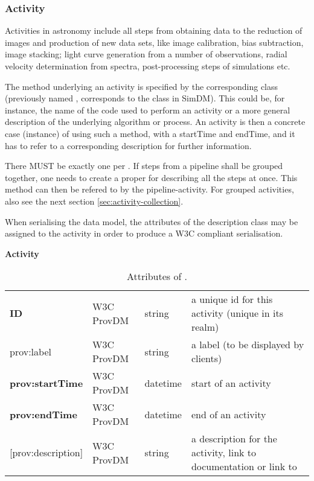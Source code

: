\subsubsection{Activity}
Activities in astronomy include all steps from obtaining data to the reduction of 
images and production of new data sets, like image calibration, bias subtraction, image stacking; 
light curve generation from a number of observations, radial velocity 
determination from spectra, post-processing steps of simulations etc.

The method underlying an activity is specified by the corresponding 
 class (previously named , corresponds 
to the  class in SimDM). This could be, 
for instance, the name of the code used to perform an activity or a more general 
description of the underlying algorithm or process. An activity is then a 
concrete case (instance) of using such a method, with a startTime and endTime, 
and it has to refer to a corresponding description for further information.

There MUST be exactly one  per . If steps from a 
pipeline shall be grouped together, one needs to create a proper 
 for describing all the steps at once. This method can then 
be refered to by the pipeline-activity. For grouped activities, also see the 
next section \ref{sec:activity-collection}.

When serialising the data model, the attributes
of the description class may be assigned to the activity in order to produce 
a W3C compliant serialisation.

\begin{table}[h]

\small
{}\textwidth

\textbf{\normalsize Activity}\vspace{0.25em}\\
\begin{tabulary}{1.0\textwidth}{@{}lp{2.5cm}lL@{}}
\toprule
{} &  &  & \\
\midrule
\textbf{ID} & W3C ProvDM  & string & a unique id for this activity (unique in its realm)\\
prov:label        & W3C ProvDM  & string & a label (to be displayed by clients)\\
\textbf{prov:startTime} & W3C ProvDM  & datetime & start of an activity\\
\textbf{prov:endTime} & W3C ProvDM  & datetime & end of an activity\\
{[prov:description]}  & W3C ProvDM & string & a description for the activity, 
				link to documentation or link to \\
\bottomrule
\end{tabulary}
\caption{Attributes of .}
\end{table}

